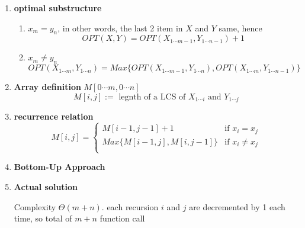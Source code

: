 \documentclass[11pt]{article}
\begin{document}
\begin{enumerate}
  \item \textbf{optimal substructure}
  \begin{enumerate}
    \item $x_m = y_n$, in other words, the last 2 item in $X$ and $Y$ same, hence
    \[
      OPT(X, Y) = OPT(X_{1\cdots m-1}, Y_{1\cdots n-1}) + 1
    \]
    \item $x_m\neq y_n$
    \[
      OPT(X_{1\cdots m}, Y_{1\cdots n}) = Max\{ OPT(X_{1\cdots m-1}, Y_{1\cdots n}), OPT(X_{1\cdots m}, Y_{1\cdots n-1}) \}
    \]
  \end{enumerate}
  \item \textbf{Array definition} $M[0\cdots m, 0\cdots n]$
  \[
    M[i, j] := \text{ legnth of a LCS of $X_{1\cdots i}$ and $Y_{1\cdots j}$}
  \]
  \item \textbf{recurrence relation}
  \[
    M[i, j] =
    \begin{cases}
      M[i-1, j-1] + 1 &  \text{if } x_i = x_j\\
      Max\{ M[i-1, j], M[i, j-1]\} &  \text{if } x_i \neq x_j\\
    \end{cases}
  \]
  \item \textbf{Bottom-Up Approach}

  \begin{algorithm}[H]
  \end{algorithm}
  \item \textbf{Actual solution}


  \begin{algorithm}[H]
  \end{algorithm}
  Complexity $\Theta(m + n)$. each recursion $i$ and $j$ are decremented by 1 each time, so total of $m+n$ function call


\end{enumerate}
\end{document}
